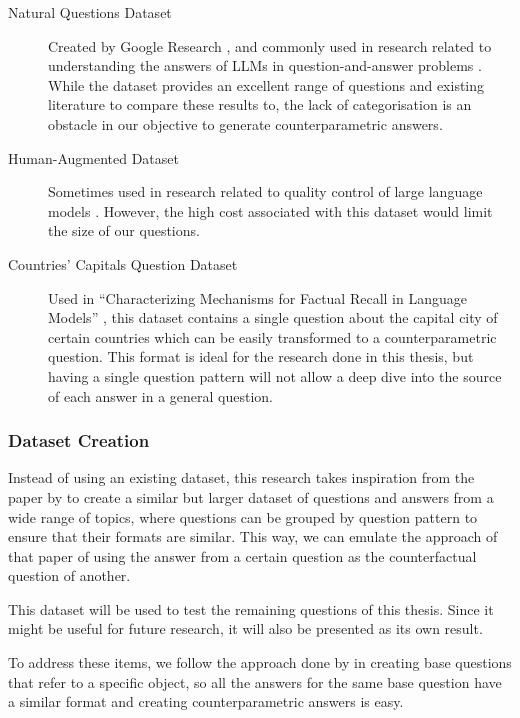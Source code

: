 \begin{description}
	\item[Natural Questions Dataset] Created by Google Research \citep{natural_questions}, and commonly used in research related to understanding the answers of LLMs in question-and-answer problems \citep{ragged,when_not_to_trust_llms,can_rag_models_reason}.
		While the dataset provides an excellent range of questions and existing literature to compare these results to, the lack of categorisation is an obstacle in our objective to generate counterparametric answers.
	\item[Human-Augmented Dataset] Sometimes used in research related to quality control of large language models \citep{learning_the_difference}.
		However, the high cost associated with this dataset would limit the size of our questions.
	\item[Countries' Capitals Question Dataset] Used in ``Characterizing Mechanisms for Factual Recall in Language Models'' \citep{factual_recall}, this dataset contains a single question about the capital city of certain countries which can be easily transformed to a counterparametric question.
		This format is ideal for the research done in this thesis, but having a single question pattern will not allow a deep dive into the source of each answer in a general question.
\end{description}

\subsubsection{Dataset Creation}

Instead of using an existing dataset, this research takes inspiration from the paper by \citeauthor{factual_recall} to create a similar but larger dataset of questions and answers from a wide range of topics, where questions can be grouped by question pattern to ensure that their formats are similar.
This way, we can emulate the approach of that paper of using the answer from a certain question as the counterfactual question of another.

This dataset will be used to test the remaining questions of this thesis.
Since it might be useful for future research, it will also be presented as its own result.

To address these items, we follow the approach done by \citeauthor{factual_recall} in creating base questions that refer to a specific object, so all the answers for the same base question have a similar format and creating counterparametric answers is easy.

